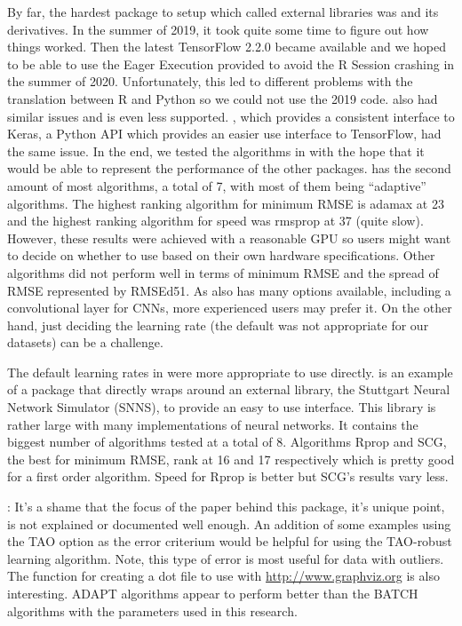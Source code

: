 By far, the hardest package to setup which called external libraries was
 \citep{R-tensorflow} and its derivatives. In the
summer of 2019, it took quite some time to figure out how things worked.
Then the latest \textsf{TensorFlow} 2.2.0 became available and we hoped
to be able to use the Eager Execution provided to avoid the \textsf{R}
Session crashing in the summer of 2020. Unfortunately, this led to
different problems with the translation between \textsf{R} and
\textsf{Python} so we could not use the 2019 code.
 \citep{R-tfestimators} also had similar issues
and is even less supported.  \citep{R-kerasR}, which
provides a consistent interface to Keras, a \textsf{Python} API which
provides an easier use interface to TensorFlow, had the same issue. In
the end, we tested the algorithms in  \citep{R-keras}
with the hope that it would be able to represent the performance of the
other packages.  has the second amount of most
algorithms, a total of 7, with most of them being ``adaptive''
algorithms. The highest ranking algorithm for minimum RMSE is adamax at
23 and the highest ranking algorithm for speed was rmsprop at 37 (quite
slow). However, these results were achieved with a reasonable GPU so
users might want to decide on whether to use  based on
their own hardware specifications. Other algorithms did not perform well
in terms of minimum RMSE and the spread of RMSE represented by RMSEd51.
As  also has many options available, including a
convolutional layer for CNNs, more experienced users may prefer it. On
the other hand, just deciding the learning rate (the default was not
appropriate for our datasets) can be a challenge.

The default learning rates in  \citep{R-RSNNS} were more
appropriate to use directly.  is an example of a package
that directly wraps around an external library, the Stuttgart Neural
Network Simulator (SNNS), to provide an easy to use interface. This
library is rather large with many implementations of neural networks. It
contains the biggest number of algorithms tested at a total of 8.
Algorithms Rprop and SCG, the best for minimum RMSE, rank at 16 and 17
respectively which is pretty good for a first order algorithm. Speed for
Rprop is better but SCG's results vary less.

 \citep{R-AMORE}: It's a shame that the focus of the
paper behind this package, it's unique point, is not explained or
documented well enough. An addition of some examples using the TAO
option as the error criterium would be helpful for using the TAO-robust
learning algorithm. Note, this type of error is most useful for data
with outliers. The function for creating a dot file to use with
\url{http://www.graphviz.org} is also interesting. ADAPT algorithms
appear to perform better than the BATCH algorithms with the parameters
used in this research.

